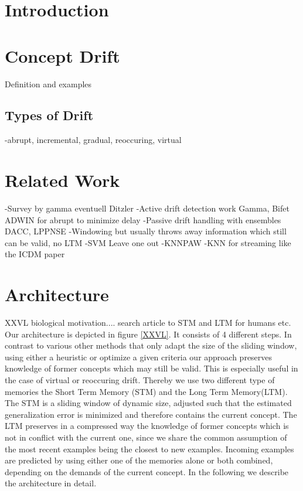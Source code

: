 \documentclass[conference]{IEEEtran}
\begin{document}
\IEEEpeerreviewmaketitle

\section{Introduction}
\section{Concept Drift}
Definition and examples
\subsection{Types of Drift}
-abrupt, incremental, gradual, reoccuring, virtual
\section{Related Work}
-Survey by gamma eventuell Ditzler
-Active drift detection work Gamma, Bifet ADWIN for abrupt to minimize delay
-Passive drift handling with ensembles DACC, LPPNSE
-Windowing but usually throws away information which still can be valid, no LTM
  -SVM Leave one out
  -KNNPAW 
-KNN for streaming like the ICDM paper


\section{Architecture}
XXVL biological motivation.... search article to STM and LTM for humans etc.
Our architecture is depicted in figure \ref{XXVL}. It consists of 4 different steps. 
In contrast to various other methods that only adapt the size of the sliding window, using either a heuristic \cite{XXVL} or optimize a given criteria \cite{XXVL} 
our approach preserves knowledge of former concepts which may still be valid. This is especially useful in the case of virtual or reoccuring drift.
Thereby we use two different type of memories the Short Term Memory (STM) and the Long Term Memory(LTM). The STM is a sliding window of dynamic size, adjusted such that the
estimated generalization error is minimized and therefore contains the current concept.
The LTM preserves in a compressed way the knowledge of former concepts which is not in conflict with the current one, since we share the common assumption of the most recent examples
being the closest to new examples. Incoming examples are predicted by using either one of the memories alone or both combined, depending on the demands of the current concept. 
In the following we describe the architecture in detail.
\end{document}
